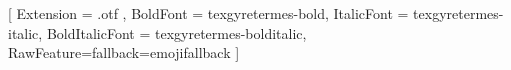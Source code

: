 
\usepackage[version=4]{mhchem}
\usepackage[english]{babel}
\usepackage{amsmath}
\usepackage{booktabs}
\usepackage{xcolor}
\usepackage{fontspec}
\usepackage{emoji}
\usepackage{float}
\usepackage{caption}
\usepackage{fontawesome5}
\captionsetup{labelfont = bf}
\usepackage{subcaption}
\captionsetup[sub]{labelfont = bf}
\usepackage[section]{placeins}
\usepackage{hyperref}
\renewcommand{\thefootnote}{\alph{footnote}}
\newcommand{\urlfoot}[2]{#2\footnote{\url{#1}}}
% 
\usepackage{authblk}
\renewcommand*{\Authsep}{, }
\renewcommand*{\Authand}{, }
\renewcommand*{\Authands}{, }
\renewcommand\Affilfont{\small}

\setmainfont{texgyretermes-regular}[
  Extension      = .otf ,
  BoldFont       = texgyretermes-bold,
  ItalicFont     = texgyretermes-italic,
  BoldItalicFont = texgyretermes-bolditalic,
  RawFeature={fallback=emojifallback}
]

